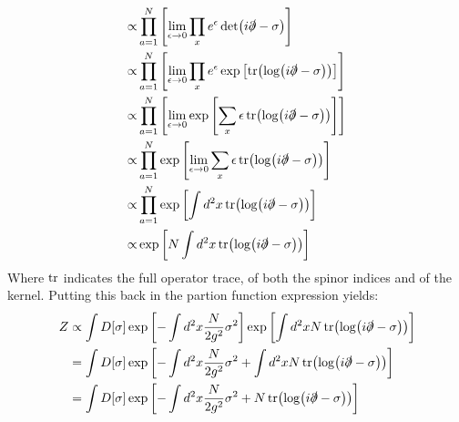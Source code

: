 \documentclass[12pt,a4]{article}
\begin{document}
\begin{enumerate}
\begin{enumerate}
\begin{align*}
                                                                                                                                       \propto      & \prod_{a = 1}^N \left[\lim_{\epsilon \to 0} \prod_xe^\epsilon \det(i \slashed{\partial} - \sigma)\right]\\
                                                                                                                                       \propto      & \prod_{a = 1}^N \left[\lim_{\epsilon \to 0} \prod_x e^\epsilon \exp\left[\tr(\log(i \slashed{\partial} - \sigma))\right]\right]\\
                                                                                                                                       \propto      & \prod_{a = 1}^N \left[\lim_{\epsilon \to 0} \exp\left[\sum_x \epsilon\tr(\log(i \slashed{\partial} - \sigma))\right]\right]\\
                                                                                                                                       \propto      & \prod_{a = 1}^N  \exp\left[\lim_{\epsilon \to 0} \sum_x \epsilon\tr(\log(i \slashed{\partial} - \sigma))\right]\\
                                                                                                                                       \propto      & \prod_{a = 1}^N\exp\left[\int d^2 x \tr(\log(i \slashed{\partial} - \sigma))\right]\\
                                                                                                                                       \propto      & \exp\left[N \int d^2 x \tr(\log(i \slashed{\partial} - \sigma))\right]\\
        \end{align*}
        Where $\tr$ indicates the full operator trace, of both the spinor indices and of the kernel.
        Putting this back in the partion function expression yields:
        \begin{align*}
          Z &\propto \int D[\sigma] \exp\left[- \int d^2x \frac{N}{2g^2} \sigma^2\right]\exp\left[ \int d^2 x N \tr(\log(i \slashed{\partial} - \sigma))\right]\\
            &= \int D[\sigma] \exp\left[- \int d^2x \frac{N}{2g^2} \sigma^2 +  \int d^2 x N \tr(\log(i \slashed{\partial} - \sigma))\right]\\
            &= \int D[\sigma] \exp\left[- \int d^2x \frac{N}{2g^2} \sigma^2 +  N \tr(\log(i \slashed{\partial} - \sigma))\right]
        \end{align*}

\end{enumerate}
\end{enumerate}
\end{document}
